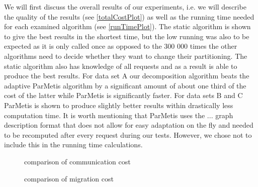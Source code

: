 \documentclass[a4paper,xcolor=dvipsnames, tikz, 12pt]{article}
\newcommand{\nl}{\newline}
\theoremstyle{definition}
\begin{document}
We will first discuss the overall results of our experiments, i.e. we will describe the quality of the results (see \cref{totalCostPlot}) as well as the running time needed for each examined algorithm (see \cref{runTimePlot}).\nl
The static algorithm is shown to give the best results in the shortest time, but the low running was also to be expected as it is only called once as opposed to the 300 000 times the other algorithms need to decide whether they want to change their partitioning. The static algorithm also has knowledge of all requests and as a result is able to produce the best results. \nl
For data set A our decomposition algorithm beats the adaptive ParMetis algorithm by a significant amount of about one third of the cost of the latter while ParMetis is significantly faster. For data sets B and C ParMetis is shown to produce slightly better results within drastically less computation time. It is worth mentioning that ParMetis uses the ... graph description format that does not allow for easy adaptation on the fly and needed to be recomputed after every request during our tests. However, we chose not to include this in the running time calculations.\nl

\begin{figure}
	\caption{comparison of communication cost}\label{commCostPlot}
\end{figure}

\begin{figure}
	\caption{comparison of migration cost}\label{migCostPlot}
\end{figure}
\end{document}
